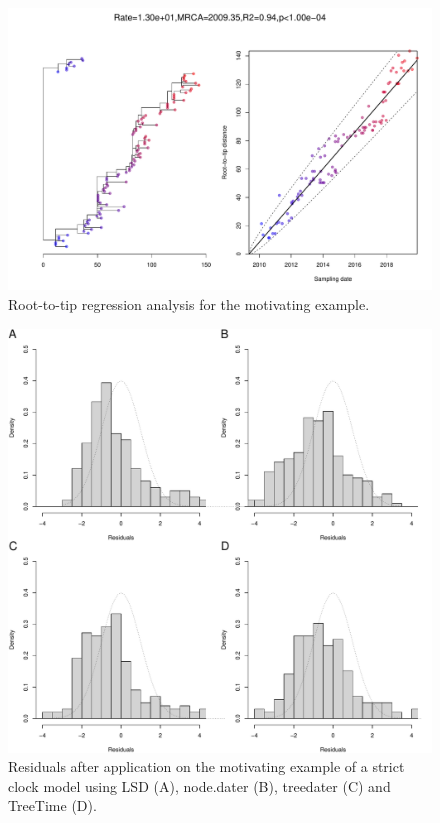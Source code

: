 \documentclass{article}
\begin{document}
\newpage
\setcounter{figure}{0}
\setcounter{table}{0}
\makeatletter 
\renewcommand{\thefigure}{S\@arabic\c@figure} 
\renewcommand{\thetable}{S\@arabic\c@table} 
\makeatother

\begin{figure}[t!]
\begin{center}
\includegraphics[width=15cm]{exampleS1.pdf}
\end{center}
\caption{Root-to-tip regression analysis for the motivating example.
\label{fig:exampleS1}}
\end{figure}

\begin{figure}[t!]
\begin{center}
\includegraphics[width=15cm]{exampleS2.pdf}
\end{center}
\caption{Residuals after application on the motivating example of a strict clock model using LSD (A), node.dater (B), treedater (C) and TreeTime (D).
\label{fig:exampleS2}}
\end{figure}
\end{document}
